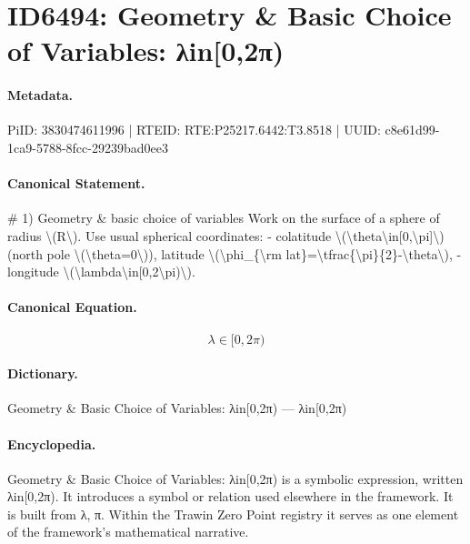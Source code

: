 \section*{ID6494: Geometry \& Basic Choice of Variables: λin[0,2π)}
\paragraph{Metadata.}
PiID: 3830474611996 | RTEID: RTE:P25217.6442:T3.8518 | UUID: c8e61d99-1ca9-5788-8fcc-29239bad0ee3

\paragraph{Canonical Statement.}
\# 1) Geometry \& basic choice of variables Work on the surface of a sphere of radius \textbackslash{}(R\textbackslash{}). Use usual spherical coordinates: - colatitude \textbackslash{}(\textbackslash{}theta\textbackslash{}in[0,\textbackslash{}pi]\textbackslash{}) (north pole \textbackslash{}(\textbackslash{}theta=0\textbackslash{})), latitude \textbackslash{}(\textbackslash{}phi\_\{\textbackslash{}rm lat\}=\textbackslash{}tfrac\{\textbackslash{}pi\}\{2\}-\textbackslash{}theta\textbackslash{}), - longitude \textbackslash{}(\textbackslash{}lambda\textbackslash{}in[0,2\textbackslash{}pi)\textbackslash{}).

\paragraph{Canonical Equation.}
\[
\lambda\in[0,2\pi)
\]

\paragraph{Dictionary.}
Geometry \& Basic Choice of Variables: λin[0,2π) — λin[0,2π)

\paragraph{Encyclopedia.}
Geometry \& Basic Choice of Variables: λin[0,2π) is a symbolic expression, written λin[0,2π). It introduces a symbol or relation used elsewhere in the framework. It is built from λ, π. Within the Trawin Zero Point registry it serves as one element of the framework's mathematical narrative.
